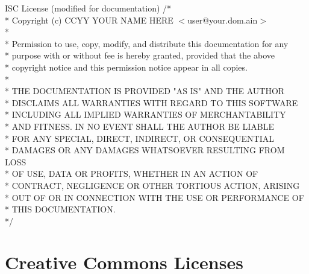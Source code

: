 \documentclass{beamer}
\begin{document}
\begin{frame}

\footnotesize

\begin{block}{ISC License (modified for documentation)} 
/* \\
 * Copyright (c) CCYY YOUR NAME HERE $<$user@your.dom.ain$>$ \\
 * \\
 * \alert{Permission} to \alert{use}, \alert{copy}, \alert{modify}, and \alert{distribute} this \alert{documentation} for \alert{any \\
 * purpose} with or without fee is hereby granted, provided that the above \\
 * copyright notice and this permission notice appear in all copies. \\
 * \\
 * THE DOCUMENTATION IS PROVIDED "AS IS" AND THE AUTHOR \\
 * DISCLAIMS ALL WARRANTIES WITH REGARD TO THIS SOFTWARE \\
 * INCLUDING ALL IMPLIED WARRANTIES OF MERCHANTABILITY \\
 * AND FITNESS. IN NO EVENT SHALL THE AUTHOR BE LIABLE \\
 * FOR ANY SPECIAL, DIRECT, INDIRECT, OR CONSEQUENTIAL \\
 * DAMAGES OR ANY DAMAGES WHATSOEVER RESULTING FROM LOSS \\
 * OF USE, DATA OR PROFITS, WHETHER IN AN ACTION OF \\
 * CONTRACT, NEGLIGENCE OR OTHER TORTIOUS ACTION, ARISING \\
 * OUT OF OR IN CONNECTION WITH THE USE OR PERFORMANCE OF \\
 * THIS DOCUMENTATION. \\
 */
 
\end{block}

\end{frame}




\section{Creative Commons Licenses}
\end{document}

